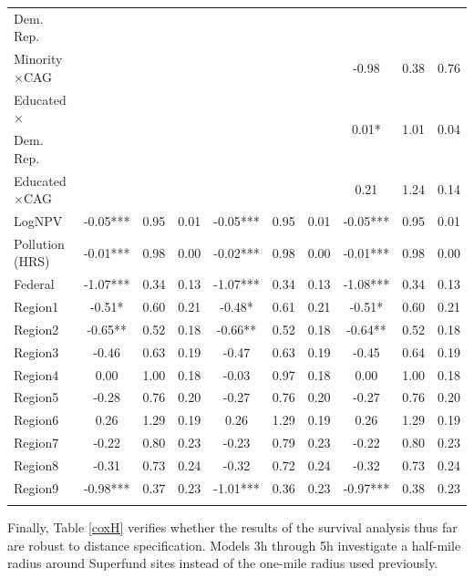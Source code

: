 \documentclass[12pt]{article}
\begin{document}
\begin{table}[H]
{\begin{tabular}{lccc|ccc|ccc}
			 \hspace{10pt}Dem. Rep. & & & & & & & & & \\
			Minority$\times$CAG &       &       &       &       &       &       &  {-0.98} &  {0.38}  & {0.76} \\
			Educated$\times$ &       &       &       &       &       &       & \multirow{2}{*}{0.01*} & \multirow{2}{*}{1.01}  & \multirow{2}{*}{0.04} \\
			\hspace{10pt}Dem. Rep. & & & & & & & & & \\
			Educated$\times$CAG &       &       &       &       &       &       & 0.21  & 1.24  & 0.14 \\
			LogNPV & -0.05*** & 0.95  & 0.01  & -0.05*** & 0.95  & 0.01  & -0.05*** & 0.95  & 0.01 \\
			Pollution (HRS) & -0.01*** & 0.98  & 0.00  & -0.02*** & 0.98  & 0.00  & -0.01*** & 0.98  & 0.00 \\
			Federal & -1.07*** & 0.34  & 0.13  & -1.07*** & 0.34  & 0.13  & -1.08*** & 0.34  & 0.13 \\
			Region1 & -0.51* & 0.60  & 0.21  & -0.48* & 0.61  & 0.21  & -0.51* & 0.60  & 0.21 \\
			Region2 & -0.65** & 0.52  & 0.18  & -0.66** & 0.52  & 0.18  & -0.64** & 0.52  & 0.18 \\
			Region3 & -0.46 & 0.63  & 0.19  & -0.47 & 0.63  & 0.19  & -0.45 & 0.64  & 0.19 \\
			Region4 & 0.00  & 1.00  & 0.18  & -0.03 & 0.97  & 0.18  & 0.00  & 1.00  & 0.18 \\
			Region5 & -0.28 & 0.76  & 0.20  & -0.27 & 0.76  & 0.20  & -0.27 & 0.76  & 0.20 \\
			Region6 & 0.26  & 1.29  & 0.19  & 0.26  & 1.29  & 0.19  & 0.26  & 1.29  & 0.19 \\
			Region7 & -0.22 & 0.80  & 0.23  & -0.23 & 0.79  & 0.23  & -0.22 & 0.80  & 0.23 \\
			Region8 & -0.31 & 0.73  & 0.24  & -0.32 & 0.72  & 0.24  & -0.32 & 0.73  & 0.24 \\
			Region9 & -0.98*** & 0.37  & 0.23  & -1.01*** & 0.36  & 0.23  & -0.97*** & 0.38  & 0.23 \\
			\hline
			\addlinespace[1ex]
			\multicolumn{3}{l}{\textsuperscript{***}$p\leq0.001$, 
				\textsuperscript{**}$p\leq0.01$, 
				\textsuperscript{*}$p\leq0.05$}
	\end{tabular}}
\end{table}


Finally, Table \ref{coxH} verifies whether the results of the survival analysis thus far are robust to distance specification. Models 3h through 5h investigate a half-mile radius around Superfund sites instead of the one-mile radius used previously. 
\end{document}
